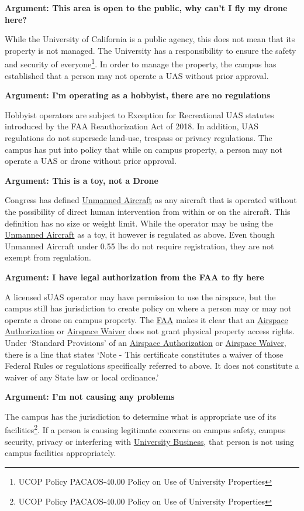 \documentclass[
]{book}
\begin{document}
\textbf{Argument: This area is open to the public, why can't I fly my drone here?}

While the University of California is a public agency, this does not mean that its property is not managed. The University has a responsibility to ensure the safety and security of everyone\footnote{UCOP Policy PACAOS-40.00 Policy on Use of University Properties}. In order to manage the property, the campus has established that a person may not operate a UAS without prior approval.

\textbf{Argument: I'm operating as a hobbyist, there are no regulations}

Hobbyist operators are subject to Exception for Recreational UAS statutes introduced by the FAA Reauthorization Act of 2018. In addition, UAS regulations do not supersede land-use, trespass or privacy regulations. The campus has put into policy that while on campus property, a person may not operate a UAS or drone without prior approval.

\textbf{Argument: This is a toy, not a Drone}

Congress has defined \protect\hyperlink{UA}{Unmanned Aircraft} as any aircraft that is operated without the possibility of direct human intervention from within or on the aircraft. This definition has no size or weight limit. While the operator may be using the \protect\hyperlink{UA}{Unmanned Aircraft} as a toy, it however is regulated as above. Even though Unmanned Aircraft under 0.55 lbs do not require registration, they are not exempt from regulation.

\textbf{Argument: I have legal authorization from the FAA to fly here}

A licensed sUAS operator may have permission to use the airspace, but the campus still has jurisdiction to create policy on where a person may or may not operate a drone on campus property. The \protect\hyperlink{FAA}{FAA} makes it clear that an \protect\hyperlink{AA}{Airspace Authorization} or \protect\hyperlink{AW}{Airspace Waiver} does not grant physical property access rights. Under `Standard Provisions' of an \protect\hyperlink{AA}{Airspace Authorization} or \protect\hyperlink{AW}{Airspace Waiver}, there is a line that states `Note - This certificate constitutes a waiver of those Federal Rules or regulations specifically referred to above. It does not constitute a waiver of any State law or local ordinance.'

\textbf{Argument: I'm not causing any problems}

The campus has the jurisdiction to determine what is appropriate use of its facilities\footnote{UCOP Policy PACAOS-40.00 Policy on Use of University Properties}. If a person is causing legitimate concerns on campus safety, campus security, privacy or interfering with \protect\hyperlink{UB}{University Business}, that person is not using campus facilities appropriately.
\end{document}
